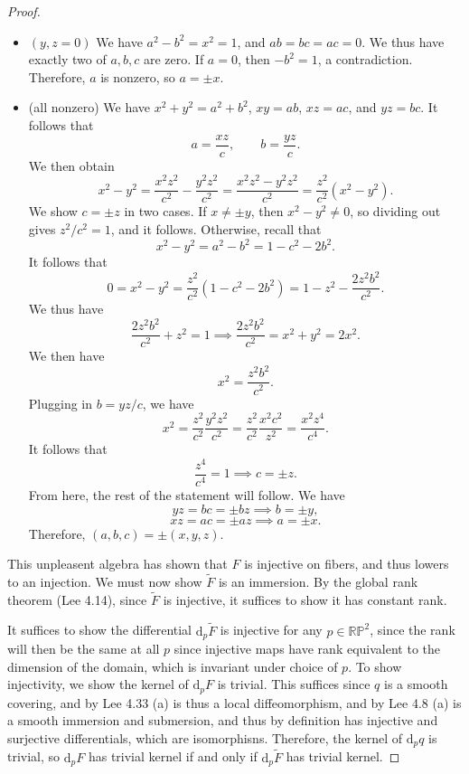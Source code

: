 \documentclass[11pt, letterpaper]{article}
\theoremstyle{plain}
\begin{document}
\begin{proof}
\begin{itemize}
		\item $(y,z=0)$ We have $a^2-b^2=x^2=1$, and $ab=bc=ac=0$. We thus have exactly two of $a,b,c$ are zero. If $a=0$, then $-b^2=1$, a contradiction. Therefore, $a$ is nonzero, so $a=\pm x$.
		\item (all nonzero) We have $x^2+y^2=a^2+b^2$, $xy=ab$, $xz=ac$, and $yz=bc$. It follows that
			\[
				a=\frac{xz}{c} ,\qquad b=\frac{yz}{c} 
			.\]
			We then obtain
			\[
				x^2-y^2=\frac{x^2z^2}{c^2} -\frac{y^2z^2}{c^2} =\frac{x^2z^2-y^2z^2}{c^2} =\frac{z^2}{c^2} \left( x^2-y^2 \right) 
			.\]
			We show $c=\pm z$ in two cases. If $x\neq \pm y$, then $x^2-y^2\neq 0$, so dividing out gives $z^2/c^2=1$, and it follows. Otherwise, recall that
			\[
				x^2-y^2=a^2-b^2=1-c^2-2b^2
			.\]
			It follows that
			\[
				0=x^2-y^2=\frac{z^2}{c^2} \left( 1-c^2-2b^2 \right) =1-z^2-\frac{2z^2b^2}{c^2} 
			.\]
			We thus have
			\[
				\frac{2z^2b^2}{c^2} +z^2=1 \implies \frac{2z^2b^2}{c^2} =x^2+y^2=2x^2
			.\]
			We then have
			\[
				x^2=\frac{z^2b^2}{c^2} 
			.\]
			Plugging in $b=yz/c$, we have
			\[
				x^2=\frac{z^2}{c^2} \frac{y^2z^2}{c^2} =\frac{z^2}{c^2} \frac{x^2c^2}{z^2} =\frac{x^2z^4}{c^4} 
			.\]
			It follows that
			\[
				\frac{z^4}{c^4} =1 \implies c=\pm z
			.\]
			From here, the rest of the statement will follow. We have
			\[
				yz=bc =\pm bz \implies b=\pm y,
			\]
			\[
				xz=ac=\pm az \implies a=\pm x
			.\]
			Therefore, $(a,b,c)=\pm(x,y,z)$.
	\end{itemize}
	This unpleasent algebra has shown that $F$ is injective on fibers, and thus lowers to an injection. We must now show $\widetilde{F} $ is an immersion. By the global rank theorem (Lee 4.14), since $\widetilde{F} $ is injective, it suffices to show it has constant rank.

	It suffices to show the differential $\mathrm{d}_p\widetilde{F}$ is injective for any $p\in\mathbb{R} \mathbb{P} ^2$, since the rank will then be the same at all $p$ since injective maps have rank equivalent to the dimension of the domain, which is invariant under choice of $p$. To show injectivity, we show the kernel of $\mathrm{d}_pF$ is trivial. This suffices since $q$ is a smooth covering, and by Lee 4.33 (a) is thus a local diffeomorphism, and by Lee 4.8 (a) is a smooth immersion and submersion, and thus by definition has injective and surjective differentials, which are isomorphisns. Therefore, the kernel of $\mathrm{d}_pq$ is trivial, so $\mathrm{d}_pF$ has trivial kernel if and only if $\mathrm{d} _p \widetilde{F} $ has trivial kernel.


\end{proof}
\end{document}
